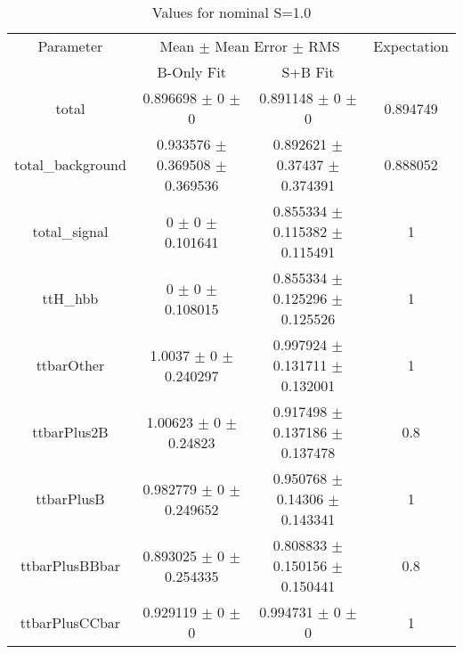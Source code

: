 \begin{table}
\centering
\caption{Values for nominal S=1.0}
\begin{tabular}{cccc}
\toprule
Parameter & \multicolumn{2}{c}{Mean $\pm$ Mean Error $\pm$ RMS} & Expectation\\
 & B-Only Fit & S+B Fit & \\
\midrule
total & \num{0.896698} $\pm$ \num{0} $\pm$ \num{0} & \num{0.891148} $\pm$ \num{0} $\pm$ \num{0} & \num{0.894749}\\
total\_background & \num{0.933576} $\pm$ \num{0.369508} $\pm$ \num{0.369536} & \num{0.892621} $\pm$ \num{0.37437} $\pm$ \num{0.374391} & \num{0.888052}\\
total\_signal & \num{0} $\pm$ \num{0} $\pm$ \num{0.101641} & \num{0.855334} $\pm$ \num{0.115382} $\pm$ \num{0.115491} & \num{1}\\
ttH\_hbb & \num{0} $\pm$ \num{0} $\pm$ \num{0.108015} & \num{0.855334} $\pm$ \num{0.125296} $\pm$ \num{0.125526} & \num{1}\\
ttbarOther & \num{1.0037} $\pm$ \num{0} $\pm$ \num{0.240297} & \num{0.997924} $\pm$ \num{0.131711} $\pm$ \num{0.132001} & \num{1}\\
ttbarPlus2B & \num{1.00623} $\pm$ \num{0} $\pm$ \num{0.24823} & \num{0.917498} $\pm$ \num{0.137186} $\pm$ \num{0.137478} & \num{0.8}\\
ttbarPlusB & \num{0.982779} $\pm$ \num{0} $\pm$ \num{0.249652} & \num{0.950768} $\pm$ \num{0.14306} $\pm$ \num{0.143341} & \num{1}\\
ttbarPlusBBbar & \num{0.893025} $\pm$ \num{0} $\pm$ \num{0.254335} & \num{0.808833} $\pm$ \num{0.150156} $\pm$ \num{0.150441} & \num{0.8}\\
ttbarPlusCCbar & \num{0.929119} $\pm$ \num{0} $\pm$ \num{0} & \num{0.994731} $\pm$ \num{0} $\pm$ \num{0} & \num{1}\\
\bottomrule
\end{tabular}
\end{table}